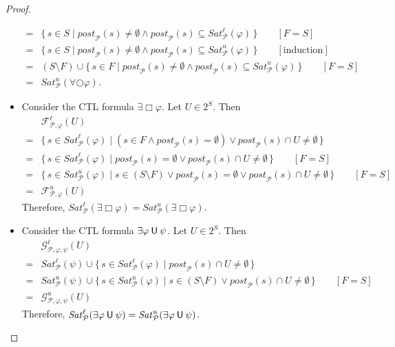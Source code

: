 \documentclass[12pt]{article}
\newcommand{\always}{\Box}
\newcommand{\nxt}{\bigcirc}
\newcommand{\until}{\mathbin{\sf U}}
\theoremstyle{definition}
\newcommand{\comment}[1]{\hspace{2em}[\mbox{#1}]}
\begin{document}
\begin{proof}
\begin{itemize}
\begin{align*}
= & \{\, s \in S \mid \mathit{post}_{\mathcal{P}}(s) \not= \emptyset \wedge \mathit{post}_{\mathcal{P}}(s) \subseteq \mathit{Sat}^{\ell}_{\mathcal{P}}(\varphi) \,\}
\comment{$F = S$}\\
= & \{\, s \in S \mid \mathit{post}_{\mathcal{P}}(s) \not= \emptyset \wedge \mathit{post}_{\mathcal{P}}(s) \subseteq \mathit{Sat}^{u}_{\mathcal{P}}(\varphi) \,\}
\comment{induction}\\
= & (S \setminus F) \cup \{\, s \in F \mid \mathit{post}_{\mathcal{P}}(s) \not= \emptyset \wedge \mathit{post}_{\mathcal{P}}(s) \subseteq \mathit{Sat}^{u}_{\mathcal{P}}(\varphi) \,\} 
\comment{$F = S$}\\
= & \mathit{Sat}^u_{\mathcal{P}}(\forall \nxt \varphi).
\end{align*}
\item
Consider the CTL formula $\exists \always \varphi$.  Let $U \in 2^S$.  Then
\begin{align*}
& \mathcal{F}^{\ell}_{\mathcal{P}, \varphi}(U) \\
= & \{\, s \in \mathit{Sat}^{\ell}_{\mathcal{P}}(\varphi) \mid (s \in F \wedge \mathit{post}_{\mathcal{P}}(s) = \emptyset) \vee \mathit{post}_{\mathcal{P}}(s) \cap U \not= \emptyset \,\}\\
= & \{\, s \in \mathit{Sat}^{\ell}_{\mathcal{P}}(\varphi) \mid  \mathit{post}_{\mathcal{P}}(s) = \emptyset \vee \mathit{post}_{\mathcal{P}}(s) \cap U \not= \emptyset \,\}
\comment{$F = S$}\\
= & \{\, s \in \mathit{Sat}^u_{\mathcal{P}}(\varphi) \mid s \in (S \setminus F) \vee \mathit{post}_{\mathcal{P}}(s) = \emptyset \vee \mathit{post}_{\mathcal{P}}(s) \cap U \not= \emptyset \,\}
\comment{$F = S$}\\
= & \mathcal{F}^{u}_{\mathcal{P}, \varphi}(U) 
\end{align*}
Therefore, $\mathit{Sat}^{\ell}_{\mathcal{P}}(\exists \always \varphi) = \mathit{Sat}^{u}_{\mathcal{P}}(\exists \always \varphi)$.
\item
Consider the CTL formula $\exists \varphi \until \psi$.  Let $U \in 2^S$.  Then
\begin{align*}
& \mathcal{G}^{\ell}_{\mathcal{P}, \varphi, \psi}(U)\\
= & \mathit{Sat}^{\ell}_{\mathcal{P}}(\psi) \cup \{\, s \in \mathit{Sat}^{\ell}_{\mathcal{P}}(\varphi) \mid  \mathit{post}_{\mathcal{P}}(s) \cap U \not= \emptyset \,\}\\
= & \mathit{Sat}^u_{\mathcal{P}}(\psi) \cup \{\, s \in \mathit{Sat}^u_{\mathcal{P}}(\varphi) \mid s \in (S \setminus F) \vee \mathit{post}_{\mathcal{P}}(s) \cap U \not= \emptyset \,\}
\comment{$F = S$}\\
= & \mathcal{G}^{u}_{\mathcal{P}, \varphi, \psi}(U)
\end{align*}
Therefore, $\mathit{Sat}^{\ell}_{\mathcal{P}}(\exists \varphi \until \psi) = \mathit{Sat}^{u}_{\mathcal{P}}(\exists \varphi \until \psi)$.
\end{itemize}
\end{proof}
\end{document}
